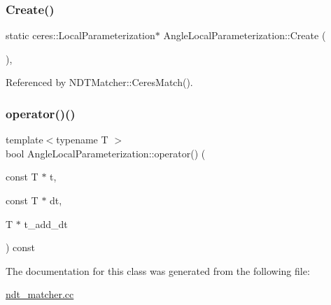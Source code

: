\subsubsection{\texorpdfstring{Create()}{Create()}}
{\footnotesize\ttfamily static ceres\+::\+Local\+Parameterization$\ast$ Angle\+Local\+Parameterization\+::\+Create (\begin{DoxyParamCaption}{ }\end{DoxyParamCaption})\hspace{0.3cm}{\ttfamily [inline]}, {\ttfamily [static]}}



Referenced by N\+D\+T\+Matcher\+::\+Ceres\+Match().

\mbox{\label{classAngleLocalParameterization_a4395ea0db2ce1f4155d6a75931fcdff1}} 
\subsubsection{\texorpdfstring{operator()()}{operator()()}}
{\footnotesize\ttfamily template$<$typename T $>$ \\
bool Angle\+Local\+Parameterization\+::operator() (\begin{DoxyParamCaption}\item[{const T $\ast$}]{t,  }\item[{const T $\ast$}]{dt,  }\item[{T $\ast$}]{t\+\_\+add\+\_\+dt }\end{DoxyParamCaption}) const\hspace{0.3cm}{\ttfamily [inline]}}



The documentation for this class was generated from the following file\+:\begin{DoxyCompactItemize}
\item 
\hyperlink{ndt__matcher_8cc}{ndt\+\_\+matcher.\+cc}\end{DoxyCompactItemize}
